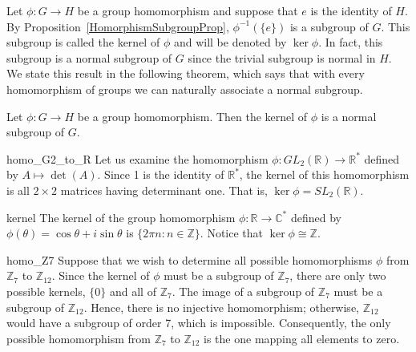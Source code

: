  
\medskip
 
 
Let $\phi : G \rightarrow H$ be a group homomorphism and suppose that
$e$ is the identity of $H$. By Proposition~\ref{HomorphismSubgroupProp}, $\phi^{-1} ( \{ e \}
)$ is a subgroup of $G$. This subgroup is called the {\bfi
kernel\/} of $\phi$ and will
be denoted by $\ker \phi$\label{kernelofphi}.  In fact, this subgroup
is a normal subgroup of $G$ since the trivial subgroup is normal in
$H$.  We state this result in the following theorem, which says that
with every homomorphism of groups we can naturally associate a normal
subgroup.   
 
 
\begin{theorem}
Let $\phi : G \rightarrow H$ be a group homomorphism. Then the kernel
of $\phi$ is a normal subgroup of $G$. 
\end{theorem}
 
 
\begin{example}{homo_G2_to_R}
Let us examine the homomorphism $\phi : GL_2( {\mathbb R }) \rightarrow
{\mathbb R}^\ast$ defined by $A \mapsto \det( A )$. Since 1 is the
identity of ${\mathbb R}^\ast$, the kernel of this homomorphism is all
$2 \times 2$ matrices having determinant one. That is, $\ker \phi =
SL_2( {\mathbb R })$.
\mbox{\hspace{1in}}
\end{example}
 
 
\begin{example}{kernel}
The kernel of the group homomorphism $\phi : {\mathbb R} \rightarrow
{\mathbb C}^\ast$ defined by $\phi( \theta ) = \cos \theta + i \sin
\theta$ is $\{ 2 \pi n : n \in {\mathbb Z} \}$. Notice that $\ker \phi
\cong {\mathbb Z}$. 
\end{example}
 
 
\begin{example}{homo_Z7}
Suppose that we wish to determine all possible homomorphisms $\phi$
from ${\mathbb Z}_7$ to  ${\mathbb Z}_{12}$. Since the kernel of $\phi$ must
be a subgroup of  ${\mathbb Z}_7$, there are only two possible
kernels, $\{ 0 \}$ and all of ${\mathbb Z}_7$.  The image of a subgroup
of ${\mathbb Z}_7$ must be a subgroup of ${\mathbb Z}_{12}$. Hence, there is
no injective homomorphism; otherwise, ${\mathbb Z}_{12}$ would have a
subgroup of order 7, which is impossible. Consequently, the only
possible homomorphism from ${\mathbb Z}_7$ to  ${\mathbb Z}_{12}$ is the one
mapping all elements to zero. 
\end{example}
 
